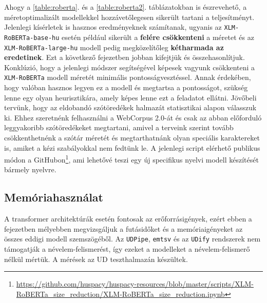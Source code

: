 \documentclass{llncs}
\newcommand{\emtsv}{\texttt{emtsv}}
\newcommand{\roberta}{\texttt{XLM-RoBERTa}}
\newcommand{\robertahub}{\texttt{XLM-RoBERTa-base-hu}}
\newcommand{\robertahul}{\texttt{XLM-RoBERTa-large-hu}}
\newcommand{\udpipe}{\texttt{UDPipe}}
\newcommand{\udify}{\texttt{UDify}}
\newcommand{\trf}{transformer}
\begin{document}
Ahogy a \ref{table:roberta}. és a \ref{table:roberta2}. táblázatokban is észrevehető, a méretoptimalizált modellekkel hozzávetőlegesen sikerült tartani a teljesítményt. Jelenlegi kísérletek is hasznos eredményeknek számítanak, ugyanis az \robertahub{} esetén például sikerült a \textbf{felére csökkenteni} a méretet és az \robertahul{} modell pedig megközelítőleg \textbf{kétharmada az eredetinek}. Ezt a következő fejezetben jobban kifejtjük és összehasonlítjuk. Konklúzió, hogy a jelenlegi módszer segítségével képesek vagyunk csökkenteni a \roberta{} modell méretét minimális pontosságvesztéssel. Annak érdekében, hogy valóban hasznos legyen ez a modell és megtartsa a pontosságot, szükség lenne egy olyan heurisztikára, amely képes lenne ezt a feladatot ellátni. Jövőbeli tervünk, hogy az eldobandó szótöredékek halmazát statisztikai alapon válasszuk ki. Ehhez szeretnénk felhasználni a WebCorpus 2.0-át \citep{Nemeskey:2020} és csak az abban előforduló leggyakoribb szótöredékeket megtartani, amivel a terveink szerint tovább csökkenthetnénk a szótár méretét és megtarthatnánk olyan speciális karaktereket is, amiket a kézi szabályokkal nem fedtünk le. A jelenlegi script elérhető publikus módon a GitHubon\footnote{\url{https://github.com/huspacy/huspacy-resources/blob/master/scripts/XLM-RoBERTa_size_reduction/XLM-RoBERTa_size_reduction.ipynb}}, ami lehetővé teszi egy új specifikus nyelvi modell készítését bármely nyelvre.


\subsection{Memóriahasználat}

A \trf{} architektúrák esetén fontosak az erőforrásigények, ezért ebben a fejezetben mélyebben megvizsgáljuk a futásidőket és a memóriaigényeket az összes eddigi modell szemszögéből. Az \udpipe{}, \emtsv{} és az \udify{} rendszerek nem támogatják a névelem-felismerést, így ezeket a modelleket a névelem-felismerő nélkül mértük. A mérések az UD teszthalmazán készültek.
\end{document}
